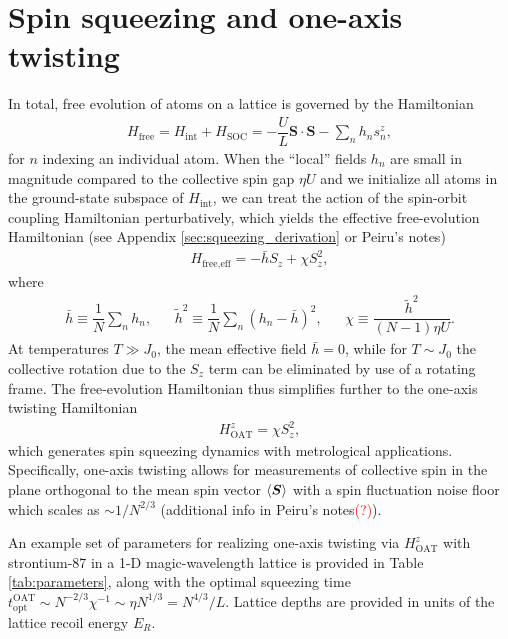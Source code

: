 \documentclass[aps,notitlepage,nofootinbib,11pt]{revtex4-1}
\renewcommand{\t}{\text} %
\newcommand{\f}[2]{\dfrac{#1}{#2}} %
\newcommand{\p}[1]{\left(#1\right)} %
\renewcommand{\v}{\bm} %
\renewcommand{\c}{\cdot} %
\newcommand{\bk}{\braket} %
\newcommand{\1}{\mathds{1}}
\newcommand{\note}[1]{\textcolor{red}{#1}}
\begin{document}
\section{Spin squeezing and one-axis twisting}
\label{sec:OAT}

In total, free evolution of atoms on a lattice is governed by the
Hamiltonian
\begin{align}
  H_{\t{free}}
  = H_{\t{int}} + H_{\t{SOC}}
  = -\f{U}{L} \v S\c\v S - \sum_n h_n s_n^z,
\end{align}
for $n$ indexing an individual atom.  When the ``local'' fields $h_n$
are small in magnitude compared to the collective spin gap $\eta U$
and we initialize all atoms in the ground-state subspace of
$H_{\t{int}}$, we can treat the action of the spin-orbit coupling
Hamiltonian perturbatively, which yields the effective free-evolution
Hamiltonian (see Appendix \ref{sec:squeezing_derivation} or Peiru's
notes)
\begin{align}
  H_{\t{free,eff}} = -\bar h S_z + \chi S_z^2,
\end{align}
where
\begin{align}
  \bar h \equiv \f1N \sum_n h_n,
  &&
  \tilde h^2 \equiv \f1N \sum_n \p{h_n - \bar h}^2,
  &&
  \chi \equiv \f{\tilde h^2}{\p{N-1}\eta U}.
\end{align}
At temperatures $T\gg J_0$, the mean effective field $\bar h=0$, while
for $T\sim J_0$ the collective rotation due to the $S_z$ term can be
eliminated by use of a rotating frame.  The free-evolution Hamiltonian
thus simplifies further to the one-axis twisting Hamiltonian
\begin{align}
  H_{\t{OAT}}^z = \chi S_z^2,
  \label{eq:H_OAT}
\end{align}
which generates spin squeezing dynamics with metrological
applications.  Specifically, one-axis twisting allows for measurements
of collective spin in the plane orthogonal to the mean spin vector
$\bk{\v S}$ with a spin fluctuation noise floor which scales as
$\sim1/N^{2/3}$ (additional info in Peiru's notes\note{(?)}).

An example set of parameters for realizing one-axis twisting via
$H_{\t{OAT}}^z$ with strontium-87 in a 1-D magic-wavelength lattice is
provided in Table \ref{tab:parameters}, along with the optimal
squeezing time
$t_{\t{opt}}^{\t{OAT}}\sim N^{-2/3}\chi^{-1}\sim\eta
N^{1/3}=N^{4/3}/L$.  Lattice depths are provided in units of the
lattice recoil energy $E_R$.
\end{document}
